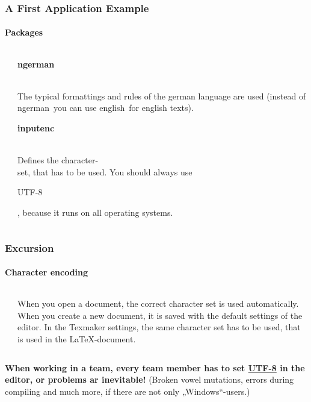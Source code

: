 \begin{frame}
\frametitle{A First Application Example}
\framesubtitle{Packages}
\begin{columns}
\begin{column}{0.6\textwidth}
\begin{ttfamily}\scriptsize

 \normalsize
\end{ttfamily}
\end{column}
\begin{column}{0.4\textwidth}
\begin{ttfamily}\textbf{ngerman}\end{ttfamily}\\
The typical formattings and rules of the german language are used (instead of \grqq ngerman\grqq ~you can use \grqq english\grqq ~for english texts).\\[5mm]

\begin{ttfamily}\textbf{inputenc}\end{ttfamily}\\
Defines the character-\\set, that has to be used. You should always use
\begin{ttfamily}UTF-8\end{ttfamily}, because it runs
on all operating systems.\\
\end{column}
\end{columns}
\end{frame}

\begin{frame}
\frametitle{Excursion}
\framesubtitle{Character encoding}
\begin{columns}
\begin{column}{0.6\textwidth}

\end{column}
\begin{column}{0.4\textwidth}
When you open a document, the correct character set is used automatically.
When you create a new document, it is saved with the default settings 
 of the editor. In the Texmaker settings, the same character set has to be used, that is used in the LaTeX-document.\\
\end{column}
\end{columns}
\textbf{When working in a team, every team member has to set \underline{UTF-8} in
the editor, or problems ar inevitable!} (Broken
vowel mutations, errors during compiling and much more, if there are not only „Windows“-users.)
\end{frame}

